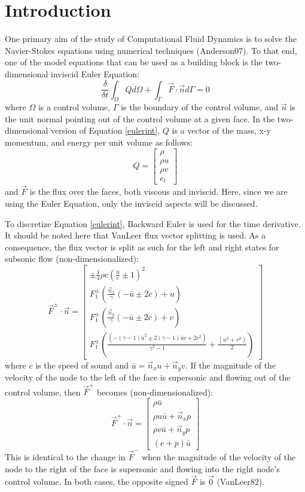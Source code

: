 \documentclass[letterpaper,twoside,11pt,openright,pdf]{book} %
\def\eqstart{\begin{equation}}
\def\eqend{\end{equation}}
\begin{document}
\section{Introduction}

One primary aim of the study of Computational Fluid Dynamics is to solve the Navier-Stokes equations using numerical techniques (Anderson07).  To that end, one of the model equations that can be used as a building block is the two-dimensional inviscid Euler Equation: 
\eqstart
\frac{\delta}{\delta t}\int_\Omega Q d\Omega + \int_\Gamma \vec{F}\cdot \vec{n} d\Gamma = 0
\label{eulerint}
\eqend
where \(\Omega\) is a control volume, \(\Gamma\) is the boundary of the control volume, and \(\vec{n}\) is the unit normal pointing out of the control volume at a given face.  In the two-dimensional version of Equation \ref{eulerint}, \(Q\) is a vector of the mass, x-y momentum, and energy per unit volume as follows:
\[Q = \left[ \begin{array}{c} \rho \\ \rho u \\ \rho v \\ e_t \end{array} \right] \]
and \(\vec{F}\) is the flux over the faces, both viscous and inviscid.  Here, since we are using the Euler Equation, only the inviscid aspects will be discussed.

To discretize Equation \ref{eulerint}, Backward Euler is used for the time derivative. It should be noted here that VanLeer flux vector splitting is used.  As a consequence, the flux vector is split as such for the left and right states for subsonic flow (non-dimensionalized):
\eqstart
\vec{F}^{\pm} \cdot \vec{n} = \left[ \begin{array}{c} \pm \frac{1}{4} \rho c \left(\frac{\bar{u}}{c} \pm 1 \right)^2 \\ F_1^{\pm} \left(\frac{\vec{n}_x}{\gamma}(-\bar{u} \pm 2c) + u \right) \\ F_1^{\pm} \left(\frac{\vec{n}_y}{\gamma}(-\bar{u} \pm 2c) + v \right) \\ F_1^{\pm} \left( \frac{(-(\gamma - 1)\bar{u}^2 \pm 2(\gamma - 1)\bar{u}c + 2c^2)}{\gamma^2 - 1} + \frac{(u^2+v^2)}{2} \right) \end{array} \right]
\label{fplusminus}
\eqend
where \(c\) is the speed of sound and \(\bar{u} = \vec{n}_x u + \vec{n}_y v\).  If the magnitude of the velocity of the node to the left of the face is supersonic and flowing out of the control volume, then \(\vec{F}^+\) becomes (non-dimensionalized):
\eqstart
\vec{F}^{+} \cdot \vec{n} = \left[ \begin{array}{c} \rho \bar{u} \\ \rho u \bar{u} + \vec{n}_x p \\ \rho v \bar{u} + \vec{n}_y p \\ (e+p)\bar{u} \end{array} \right]
\label{fplusminussonic}
\eqend
This is identical to the change in \(\vec{F}^-\) when the magnitude of the velocity of the node to the right of the face is supersonic and flowing into the right node's control volume.  In both cases, the opposite signed \(\vec{F}\) is \(\vec{0}\) (VanLeer82).  
\end{document}
